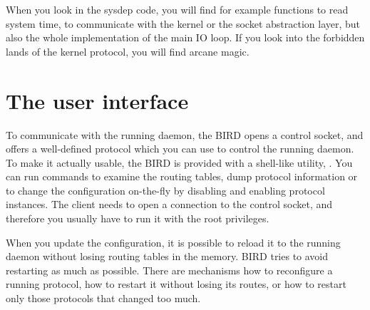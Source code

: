 When you look in the sysdep code, you will find for example functions to read
system time, to communicate with the kernel or the socket abstraction layer,
but also the whole implementation of the main IO loop. If you look into the
forbidden lands of the kernel protocol, you will find arcane magic.

\section{The user interface}
To communicate with the running daemon, the BIRD opens a control socket, and offers
a well-defined protocol which you can use to control the running daemon. To
make it actually usable, the BIRD is provided with a shell-like utility,
. You can run commands to examine the routing tables, dump protocol
information or to change the configuration on-the-fly by disabling and enabling
protocol instances. The client needs to open a connection to the control
socket, and therefore you usually have to run it with the root privileges.

When you update the configuration, it is possible to reload it to the running
daemon without losing routing tables in the memory. BIRD tries to avoid
restarting as much as possible. There are mechanisms how to reconfigure
a running protocol, how to restart it without losing its routes, or how to
restart only those protocols that changed too much.
